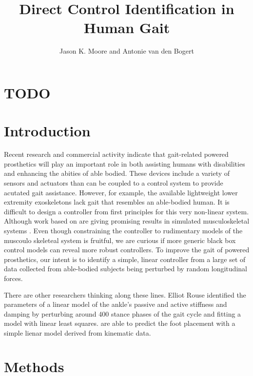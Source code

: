 \documentclass{article}
\author{Jason K. Moore and Antonie van den Bogert}
\title{Direct Control Identification in Human Gait}
\date{}
\begin{document}
\maketitle

\section*{TODO}

\listoftodos

\section*{Introduction}
%
Recent research and commercial activity indicate that gait-related powered
prosthetics will play an important role in both assisting humans with
disabilities and enhancing the abities of able bodied. These devices include a
variety of sensors and actuators than can be coupled to a control system to
provide acutated gait assistance. However, for example, the available
lightweight lower extremity exoskeletons lack gait that resembles an
able-bodied human. It is difficult to design a controller from first principles
for this very non-linear system. Although work based on \cite{Geyer2010} are
giving promising results in simulated musculoskeletal systems \cite{Wang2010,
Geitenbeek2014}. Even though constraining the controller to rudimentary models
of the muscoulo skeleteal system is fruitful, we are curious if more generic
black box control models can reveal more robust controllers. To improve the
gait of powered prosthetics, our intent is to identify a simple, linear
controller from a large set of data collected from able-bodied subjects being
perturbed by random longitudinal forces.

There are other researchers thinking along these lines. Elliot Rouse identified
the parameters of a linear model of the ankle's passive and active stiffness
and damping by perturbing around 400 stance phases of the gait cycle and
fitting a model with linear least squares. \cite{Wang2013} are able to predict
the foot placement with a simple lienar model derived from kinematic data.
%
\section*{Methods}
%
\end{document}
